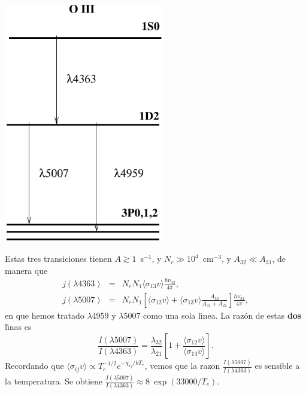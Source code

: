 



\begin{floatingfigure}{8cm}
\includegraphics[width=7cm,height=!]{oiii.pdf}
\end{floatingfigure}  Estas tres transiciones tienen $A \gtrsim 1$~s$^{-1}$, y $N_c \gg
10^{4}$~cm$^{-3}$, y $A_{32} \ll A_{31}$, de manera que
\begin{eqnarray}
j(\lambda4363) & = &  N_e N_1 \langle \sigma_{13} v \rangle \frac{h \nu_{32}}{4\pi}, \nonumber \\
j(\lambda5007) & = &  N_e N_1 \left[ \langle \sigma_{12} v \rangle  +
\langle \sigma_{13} v \rangle  \frac{A_{32}}{A_{31}+A_{21}} \right] \frac{h \nu_{21}}{4\pi}, \nonumber 
\end{eqnarray}
en que hemos tratado $\lambda4959$ y $\lambda5007$ como una sola
l\'{\i}nea. La raz\'on de estas {\bf dos} l\'{\i}nas es 
\[
\frac{I(\lambda 5007)}{I(\lambda4363)} = \frac{\lambda_{32}}{\lambda_{21}}
\left[1+\frac{\langle \sigma_{12} v \rangle}{\langle \sigma_{13} v
\rangle } \right].
\]
Recordando que $\langle \sigma_{ij} v \rangle \propto T_e^{-1/2}
e^{-\chi_{ij}/kT_e}$, vemos que la razon $\frac{I(\lambda
5007)}{I(\lambda4363)} $ es sensible a la temperatura. Se obtiene
$\frac{I(\lambda 5007)}{I(\lambda4363)} \approx 8~\exp(33000/T_e)$.

